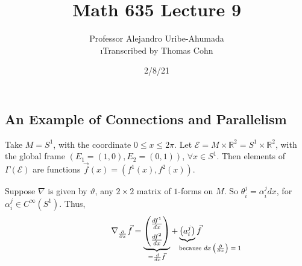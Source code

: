 \documentclass[10pt,letterpaper]{article}
\author{Professor Alejandro Uribe-Ahumada\\ \small\i{Transcribed by Thomas Cohn}}
\title{Math 635 Lecture 9}
\date{2/8/21} %
\newcommand{\n}{\hfill\break}
\newcommand{\ptxt}[1]{\textrm{\textnormal{#1}}}
\newcommand{\reals}{\mathbb{R}}
\newcommand{\R}{\reals}
\newcommand{\pd}[2]{\frac{\partial{}#1}{\partial{}#2}}
\newcommand{\paren}[1]{\left(#1\right)}
\begin{document}
\maketitle
\setlength\RaggedRightParindent{\parindent}
\RaggedRight

\subsection*{An Example of Connections and Parallelism}

\par\noindent
Take $M=S^{1}$, with the coordinate $0\le{}x\le{}2\pi$. Let $\mathcal{E}=M\times\R^{2}=S^{1}\times\R^{2}$, with the global frame $(E_{1}=(1,0),E_{2}=(0,1))$, $\forall{}x\in{}S^{1}$. Then elements of $\Gamma(\mathcal{E})$ are functions $\vec{f}(x)=(f^{1}(x),f^{2}(x))$.\n

\par\noindent
Suppose $\nabla$ is given by $\vartheta$, any $2\times{}2$ matrix of $1$-forms on $M$. So $\theta_{i}^{j}=\alpha_{i}^{j}dx$, for $\alpha_{i}^{j}\in{}C^{\infty}(S^{1})$. Thus,
\[
	\nabla_{\pd{}{x}}\vec{f}=\underbrace{\begin{pmatrix}
			\frac{df^{1}}{dx}\\[5pt]
			\frac{df^{2}}{dx}
		\end{pmatrix}}_{=\frac{d}{dx}\vec{f}}+\underbrace{\begin{pmatrix}
		a_{i}^{j}
	\end{pmatrix}}_{\hspace{-20pt}\mathrlap{\ptxt{because $dx\paren{\pd{}{x}}=1$}}}\vec{f}
\]
\end{document}
